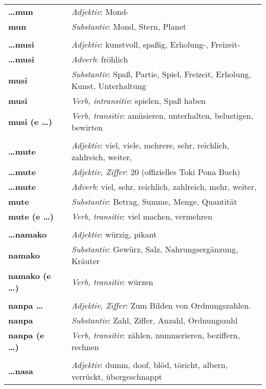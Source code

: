 \begin{supertabular}{p{2,5cm}|ll}
\textbf{\dots mun} && \textit{Adjektiv}: Mond- \\ 
\textbf{mun} && \textit{Substantiv}: Mond, Stern, Planet \\ 
 && \\ %
\textbf{\dots musi} && \textit{Adjektiv}: kunstvoll, spaßig, Erholung-, Freizeit- \\ 
\textbf{\dots musi} && \textit{Adverb}: fröhlich \\ 
\textbf{musi} && \textit{Substantiv}: Spaß, Partie, Spiel, Freizeit, Erholung, Kunst, Unterhaltung \\ 
\textbf{musi} && \textit{Verb, intransitiv}: spielen, Spaß haben \\ 
\textbf{musi (e \dots)} && \textit{Verb, transitiv}: amüsieren, unterhalten, belustigen, bewirten \\ 
 && \\ %
\textbf{\dots mute} && \textit{Adjektiv}: viel, viele, mehrere, sehr, reichlich, zahlreich, weiter, \\ 
\textbf{\dots mute} && \textit{Adjektiv, Ziffer}: 20 (offizielles Toki Pona Buch) \\ 
\textbf{\dots mute} && \textit{Adverb}: viel, sehr, reichlich, zahlreich, mehr, weiter, \\ 
\textbf{mute} && \textit{Substantiv}: Betrag, Summe, Menge, Quantität \\ 
\textbf{mute (e \dots)} && \textit{Verb, transitiv}: viel machen, vermehren \\ 
 && \\ %
\textbf{\dots namako} && \textit{Adjektiv}: würzig, pikant \\ 
\textbf{namako} && \textit{Substantiv}: Gewürz, Salz, Nahrungsergänzung, Kräuter \\ 
\textbf{namako (e \dots)} && \textit{Verb, transitiv}: würzen \\ 
 && \\ %
\textbf{nanpa \dots} && \textit{Adjektiv, Ziffer}: Zum Bilden von Ordnungszahlen. \\ 
\textbf{nanpa} && \textit{Substantiv}: Zahl, Ziffer, Anzahl, Ordnungszahl \\ 
\textbf{nanpa (e \dots)} && \textit{Verb, transitiv}: zählen, nummerieren, beziffern, rechnen \\ 
 && \\ %
\textbf{\dots nasa} && \textit{Adjektiv}: dumm, doof, blöd, töricht, albern, verrückt, übergeschnappt \\ 

\end{supertabular}
